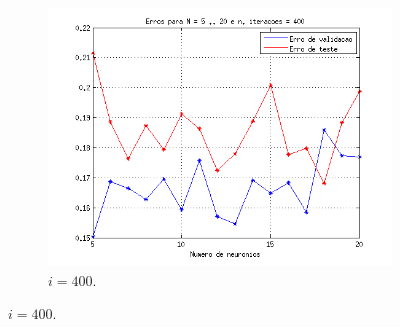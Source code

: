 \begin{figure}[H]
\begin{subfigure}{.33\textwidth}
				  \includegraphics[width=1\linewidth]{image/mlp_400_iterations}
				  \caption{\(i=400\).}
				\end{subfigure}%
				

\end{figure}
